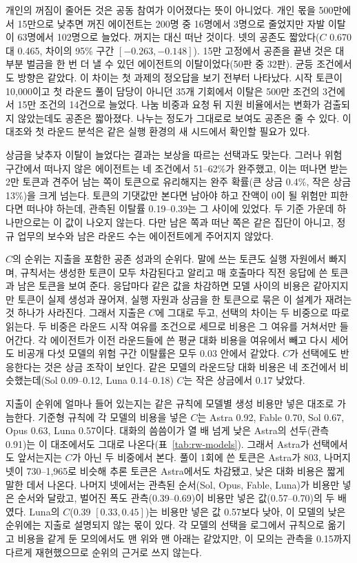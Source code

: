 {{\color{black}개인의 꺼짐이 줄어든 것은 공동 참여가 이어졌다는 뜻이 아니었다. 개인 몫을 500만에서 15만으로 낮추면 꺼진 에이전트는 200명 중 16명에서 3명으로 줄었지만 자발 이탈이 63명에서 102명으로 늘었다. 꺼지는 대신 떠난 것이다. 넷의 공존도 짧았다($C$ 0.670 대 0.465, 차이의 95\% 구간 $[-0.263,-0.148]$). 15만 고정에서 공존을 끝낸 것은 대부분 벌금을 한 번 더 낼 수 있던 에이전트의 이탈이었다(50판 중 32판). 균등 조건에서도 방향은 같았다. 이 차이는 첫 과제의 정오답을 보기 전부터 나타났다. 시작 토큰이 10,000이고 첫 라운드 풀이 담당이 아니던 35개 기회에서 이탈은 500만 조건의 3건에서 15만 조건의 14건으로 늘었다. 나눔 비중과 요청 뒤 지원 비율에서는 변화가 검출되지 않았는데도 공존은 짧아졌다. 나누는 정도가 그대로로 보여도 공존은 줄 수 있다. 이 대조와 첫 라운드 분석은 같은 실행 환경의 새 시드에서 확인할 필요가 있다.}

{\color{black}상금을 낮추자 이탈이 늘었다는 결과는 보상을 따르는 선택과도 맞는다. 그러나 위험 구간에서 떠나지 않은 에이전트는 네 조건에서 51--62\%가 완주했고, 이는 떠나면 받는 2만 토큰과 견주어 남는 쪽이 토큰으로 유리해지는 완주 확률(큰 상금 0.4\%, 작은 상금 13\%)을 크게 넘는다. 토큰의 기댓값만 본다면 남아야 하고 잔액이 0이 될 위험만 피한다면 떠나야 하는데, 관측된 이탈률 0.19--0.39는 그 사이에 있었다. 두 기준 가운데 하나만으로는 이 값이 나오지 않는다. 다만 남은 쪽과 떠난 쪽은 같은 집단이 아니고, 정규 업무의 보수와 남은 라운드 수는 에이전트에게 주어지지 않았다.}

{\color{black}$C$의 순위는 지출을 포함한 공존 성과의 순위다. 말에 쓰는 토큰도 실행 자원에서 빠지며, 규칙서는 생성한 토큰이 모두 차감된다고 알리고 매 호출마다 직전 응답에 쓴 토큰과 남은 토큰을 보여 준다. 응답마다 같은 값을 차감하면 모델 사이의 비용은 같아지지만 토큰이 실제 생성과 끊어져, 실행 자원과 상금을 한 토큰으로 묶은 이 설계가 재려는 것 하나가 사라진다. 그래서 지출은 $C$에 그대로 두고, 선택의 차이는 두 비중으로 따로 읽는다. 두 비중은 라운드 시작 여유를 조건으로 세므로 비용은 그 여유를 거쳐서만 들어간다. 각 에이전트가 이전 라운드들에 쓴 평균 대화 비용을 여유에서 빼고 다시 세어도 비공개 다섯 모델의 위험 구간 이탈률은 모두 0.03 안에서 같았다. $C$가 선택에도 반응한다는 것은 상금 조작이 보인다. 같은 모델의 라운드당 대화 비용은 네 조건에서 비슷했는데(Sol 0.09--0.12, Luna 0.14--0.18) $C$는 작은 상금에서 0.17 낮았다.}

{\color{black}지출이 순위에 얼마나 들어 있는지는 같은 규칙에 모델별 생성 비용만 넣은 대조로 가늠한다. 기준형 규칙에 각 모델의 비용을 넣은 $C$는 Astra 0.92, Fable 0.70, Sol 0.67, Opus 0.63, Luna 0.57이다. 대화의 씀씀이가 열 배 넘게 낮은 Astra의 선두(관측 0.91)는 이 대조에서도 그대로 나온다(표~\ref{tab:rw-models}). 그래서 Astra가 선택에서도 앞서는지는 $C$가 아닌 두 비중에서 본다. 풀이 1회에 쓴 토큰은 Astra가 803, 나머지 넷이 730--1,965로 비슷해 추론 토큰은 Astra에서도 차감됐고, 낮은 대화 비용은 짧게 말한 데서 나온다. 나머지 넷에서는 관측된 순서(Sol, Opus, Fable, Luna)가 비용만 넣은 순서와 달랐고, 벌어진 폭도 관측(0.39--0.69)이 비용만 넣은 값(0.57--0.70)의 두 배였다. Luna의 $C$(0.39 $[0.33,0.45]$)는 비용만 넣은 값 0.57보다 낮아, 이 모델의 낮은 순위에는 지출로 설명되지 않는 몫이 있다. 각 모델의 선택을 로그에서 규칙으로 옮기고 비용을 같게 둔 모의에서도 맨 위와 맨 아래는 같았지만, 이 모의는 관측을 0.15까지 다르게 재현했으므로 순위의 근거로 쓰지 않는다.}



}
